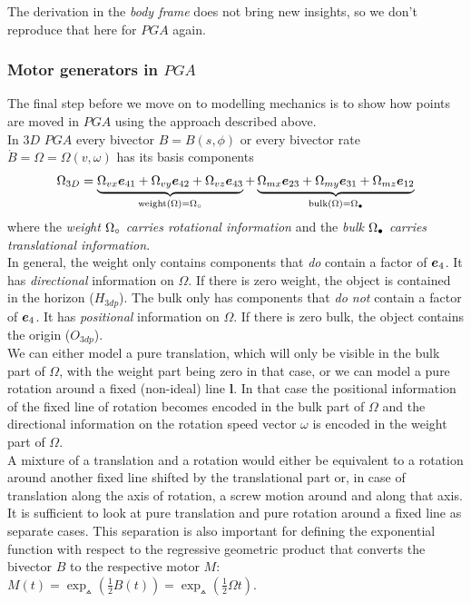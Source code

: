 The derivation in the \emph{body frame} does not bring new insights, so we don't reproduce
that here for $PGA$ again. \\

\newpage

\subsubsection{Motor generators in $PGA$}
\label{subsection:motor_generators_PGA}

The final step before we move on to modelling mechanics is to show how points are moved in
$PGA$ using the approach described above. \\

In $3D$ $PGA$ every bivector $B = B(s, \phi)$ or every bivector rate $\dot{B} = \Omega =
\Omega(v, \omega)$ has its basis components
\begin{equation}
   \Omega_{3D} =
   \underbrace{\Omega_{vx} \bm{e}_{41} + \Omega_{vy} \bm{e}_{42} +
               \Omega_{vz} \bm{e}_{43}}_{\text{weight($\Omega$)}
   ={\Omega}_\circ}
   + 
    \underbrace{\Omega_{mx} \bm{e}_{23} + \Omega_{my}\bm{e}_{31} +
    \Omega_{mz}\bm{e}_{12}}_{\text{bulk($\Omega$)}
   ={\Omega}_\bullet}
   \label{eq:rate_bivector_component_definition}
\end{equation}
where the \emph{weight ${\Omega}_\circ$ carries rotational information} and the
\emph{bulk ${\Omega}_\bullet$ carries translational information}. \\

In general, the weight only contains components that \emph{do} contain a factor of
$\bm{e}_{4}$. It has \emph{directional} information on $\Omega$. If there is zero weight, the
object is contained in the horizon ($H_{3dp}$). The bulk only has components that \emph{do
not} contain a factor of $\bm{e}_{4}$. It has \emph{positional} information on $\Omega$. If
there is zero bulk, the object contains the origin ($O_{3dp}$). \\

We can either model a pure translation, which will only be visible in the bulk part of
$\Omega$, with the weight part being zero in that case, or we can model a pure rotation
around a fixed (non-ideal) line $\bm{l}$. In that case the positional information of the
fixed line of rotation becomes encoded in the bulk part of $\Omega$ and the directional
information on the rotation speed vector $\omega$ is encoded in the weight part of
$\Omega$.\\
 
A mixture of a translation and a rotation would either be equivalent to a rotation around
another fixed line shifted by the translational part or, in case of translation along the
axis of rotation, a screw motion around and along that axis. It is sufficient to look at
pure translation and pure rotation around a fixed line as separate cases. This separation
is also important for defining the exponential function with respect to the regressive
geometric product that converts the bivector $B$ to the respective motor $M$: $M(t) =
\exp_{\wedgedot}(\frac{1}{2} B(t)) = \exp_{\wedgedot}(\frac{1}{2} \Omega t)$. \\

